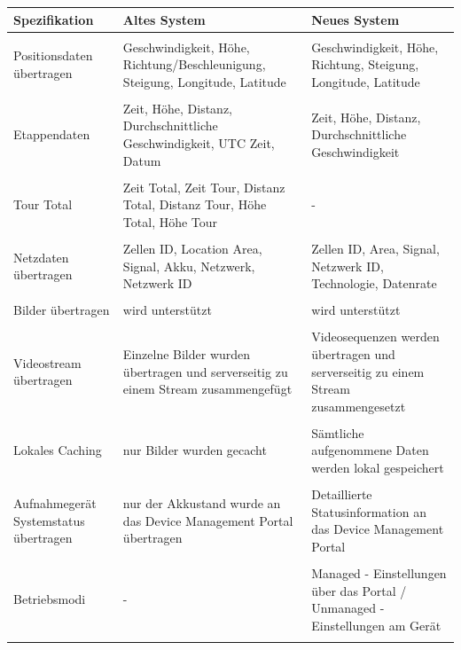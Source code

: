 \begin{longtable}{ >{\RaggedRight} p{3.5cm} | >{\RaggedRight}p{4.3cm} | >{\RaggedRight}p{4.3cm} }
    
    \textbf{Spezifikation} & \textbf{Altes System} & \textbf{Neues System} \\ [1ex] \hline \hline & &  \\ [-1.5ex]
    Positionsdaten übertragen & Geschwindigkeit, H\"{o}he, Richtung/Beschleunigung, Steigung, Longitude, Latitude & Geschwindigkeit, H\"{o}he, Richtung, Steigung, Longitude, Latitude \\ [1ex] \hline & &  \\ [-1.5ex]
    Etappendaten & Zeit, Höhe, Distanz, Durchschnittliche Geschwindigkeit, UTC Zeit, Datum & Zeit, Höhe, Distanz, Durchschnittliche Geschwindigkeit \\ [1ex] \hline & &  \\ [-1.5ex]
     Tour Total & Zeit Total, Zeit Tour, Distanz Total, Distanz Tour, Höhe Total, H\"{o}he Tour & - \\ [1ex] \hline & &  \\ [-1.5ex]
    Netzdaten übertragen & Zellen ID, Location Area, Signal, Akku, Netzwerk, Netzwerk ID & Zellen ID, Area, Signal, Netzwerk ID, Technologie, Datenrate\\ [1ex] \hline & &  \\ [-1.5ex]
    Bilder \"{u}bertragen & wird unterstützt & wird unterstützt \\ [1ex] \hline & &  \\ [-1.5ex]
    Videostream \"{u}bertragen & Einzelne Bilder wurden \"{u}bertragen und serverseitig zu einem Stream zusammengef\"{u}gt & Videosequenzen werden \"{u}bertragen und serverseitig zu einem Stream zusammengesetzt\\ [1ex] \hline & &  \\ [-1.5ex]
    Lokales Caching & nur Bilder wurden gecacht & S\"{a}mtliche aufgenommene Daten werden lokal gespeichert\\ [1ex] \hline & &  \\ [-1.5ex]
	Aufnahmegerät Systemstatus \"{u}bertragen & nur der Akkustand wurde an das Device Management Portal \"{u}bertragen & Detaillierte Statusinformation an das Device Management Portal\\ [1ex] \hline & &  \\ [-1.5ex]   
    Betriebsmodi & - & Managed - Einstellungen \"{u}ber das Portal / Unmanaged - Einstellungen am Ger\"{a}t\\ [1ex] \hline & &  \\ [-1.5ex]

\end{longtable}
